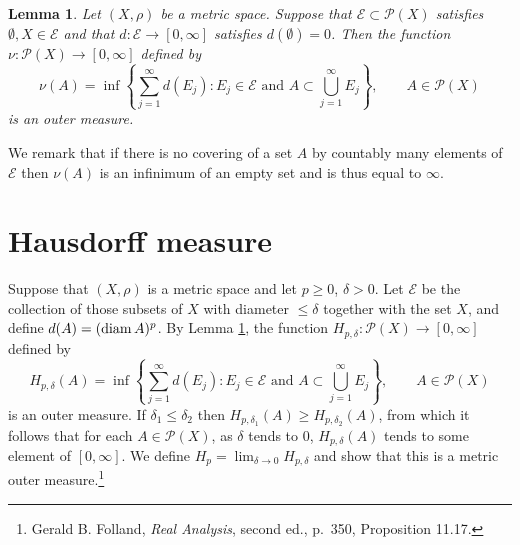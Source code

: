 \documentclass{article}
\newcommand{\diam}{\ensuremath\mathrm{diam}\,}
\newtheorem{lemma}[theorem]{Lemma}
\theoremstyle{definition}
\begin{document}
\begin{lemma}
Let $(X,\rho)$ be a metric space.
Suppose that $\mathscr{E} \subset \mathscr{P}(X)$ satisfies $\emptyset, X \in \mathscr{E}$ and that
$d:\mathscr{E} \to [0,\infty]$ satisfies $d(\emptyset)=0$. Then the function $\nu:\mathscr{P}(X) \to [0,\infty]$ defined by
\[
\nu(A) = \inf\left\{\sum_{j=1}^\infty d(E_j): E_j \in \mathscr{E} \textrm{ and } A \subset \bigcup_{j=1}^\infty E_j \right\},
\qquad A \in \mathscr{P}(X)
\]
is an outer measure.
\label{outermeasure}
\end{lemma}

We remark that if there is no covering of a set $A$ by countably many elements of $\mathscr{E}$ then $\nu(A)$ is an infinimum of an empty
set and is thus equal to $\infty$.

 





\section{Hausdorff measure}
Suppose that $(X,\rho)$ is a metric space and let $p \geq 0$, $\delta>0$.
Let $\mathscr{E}$ be the collection of those subsets of $X$ with diameter $\leq \delta$ together with the set $X$,
and define $d(A)=(\diam A)^p$. By Lemma \ref{outermeasure}, the function $H_{p,\delta}:\mathscr{P}(X) \to [0,\infty]$ defined by
\[
H_{p,\delta}(A) = \inf\left\{ \sum_{j=1}^\infty d(E_j): \textrm{$E_j \in \mathscr{E}$ and $A \subset \bigcup_{j=1}^\infty E_j$} \right\},
\qquad A \in \mathscr{P}(X)
\]
is an outer measure.
If $\delta_1 \leq \delta_2$ then $H_{p,\delta_1}(A) \geq H_{p,\delta_2}(A)$, from which it follows that  for each $A \in \mathscr{P}(X)$,
as $\delta$ tends to $0$,
$H_{p,\delta}(A)$ tends to some element of  $[0,\infty]$. We define $H_p=\lim_{\delta \to 0} H_{p,\delta}$ and show that this is a metric
outer measure.\footnote{Gerald B. Folland, {\em Real Analysis}, second ed., p.~350, Proposition 11.17.}
\end{document}
